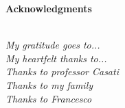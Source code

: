 \thispagestyle{empty}

\begin{center}
  {\bf \Huge Acknowledgments}
\end{center}

\vspace{4cm}


\emph{\\
  My gratitude goes to...\\
  My heartfelt thanks to...\\
  Thanks to professor Casati\\
  Thanks to my family\\
  Thanks to Francesco\\
}
